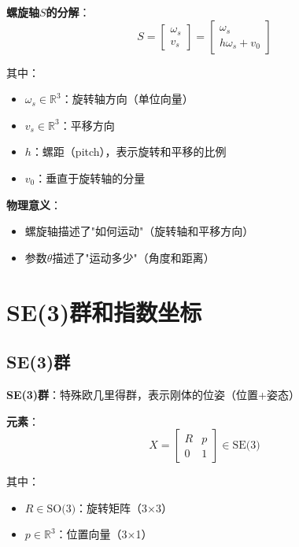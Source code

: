 \documentclass[12pt,a4paper]{article}
\begin{document}
\textbf{螺旋轴$S$的分解}：
\begin{equation}
S = \begin{bmatrix} \omega_s \\ v_s \end{bmatrix} = \begin{bmatrix} \omega_s \\ h\omega_s + v_0 \end{bmatrix}
\end{equation}

其中：
\begin{itemize}
\item $\omega_s \in \mathbb{R}^3$：旋转轴方向（单位向量）
\item $v_s \in \mathbb{R}^3$：平移方向
\item $h$：螺距（pitch），表示旋转和平移的比例
\item $v_0$：垂直于旋转轴的分量
\end{itemize}

\textbf{物理意义}：
\begin{itemize}
\item 螺旋轴描述了"如何运动"（旋转轴和平移方向）
\item 参数$\theta$描述了"运动多少"（角度和距离）
\end{itemize}

\section{SE(3)群和指数坐标}

\subsection{SE(3)群}

\textbf{SE(3)群}：特殊欧几里得群，表示刚体的位姿（位置+姿态）

\textbf{元素}：
\begin{equation}
X = \begin{bmatrix} R & p \\ 0 & 1 \end{bmatrix} \in \text{SE(3)}
\end{equation}

其中：
\begin{itemize}
\item $R \in \text{SO(3)}$：旋转矩阵（3×3）
\item $p \in \mathbb{R}^3$：位置向量（3×1）
\end{itemize}
\end{document}
